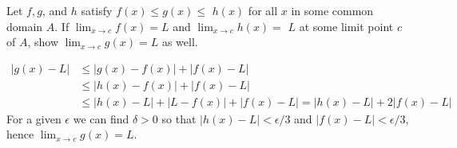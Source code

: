 \begin{exercise}
    Let \(f, g\), and $h$ satisfy $f(x) \leq g(x) \leq$ $h(x)$ for all $x$ in some common domain $A$. If $\lim _{x \rightarrow c} f(x)=L$ and $\lim _{x \rightarrow c} h(x)=$ $L$ at some limit point $c$ of $A$, show $\lim _{x \rightarrow c} g(x)=L$ as well.
\end{exercise}

\begin{solution}
    \[\begin{aligned}
|g(x) - L| &\leq |g(x) - f(x)| + |f(x) - L| \\
        &\leq |h(x) - f(x)| + |f(x) - L| \\
        & \leq |h(x) - L| + |L - f(x)| + |f(x) - L| = |h(x) - L| +2|f(x) - L|
    \end{aligned}
    \]
    For a given \(\epsilon\) we can find \(\delta> 0\) so that \(|h(x) - L| < \epsilon/3\) and \(|f(x) - L| < \epsilon/3\), hence \(\lim _{x \rightarrow c} g(x)=L\).
\end{solution}

